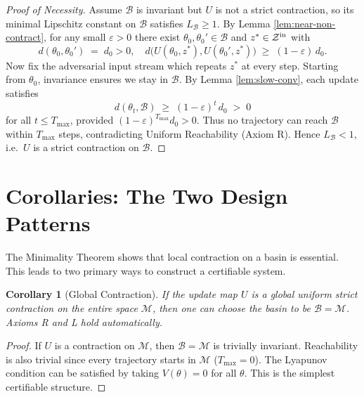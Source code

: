\documentclass[12pt]{article}
\theoremstyle{definition}
\theoremstyle{plain}
\newtheorem{corollary}{Corollary}[section]
\begin{document}
\begin{proof}[Proof of Necessity]
Assume \(\mathcal B\) is invariant but \(U\) is not a strict contraction,
so its minimal Lipschitz constant on \(\mathcal B\) satisfies \(L_{\mathcal B}\ge1\).
By Lemma \ref{lem:near-non-contract}, for any small \(\varepsilon>0\) there
exist \(\theta_0,\theta_0'\in\mathcal B\) and \(z^*\in\mathcal Z^{\rm in}\)
with
\[
d(\theta_0,\theta_0')\;=\;d_0>0,
\quad
d\bigl(U(\theta_0,z^*),U(\theta_0',z^*)\bigr)
\;\ge\;(1-\varepsilon)\,d_0.
\]
Now fix the adversarial input stream which repeats \(z^*\) at every step.
Starting from \(\theta_0\), invariance ensures we stay in \(\mathcal B\).  By
Lemma \ref{lem:slow-conv}, each update satisfies
\[
d(\theta_t,\mathcal B)\;\ge\;(1-\varepsilon)^t\,d_0
\;>\;0
\]
for all \(t\le T_{\max}\), provided
\((1-\varepsilon)^{T_{\max}}d_0>0\).  Thus no trajectory can reach
\(\mathcal B\) within \(T_{\max}\) steps, contradicting Uniform Reachability
(Axiom R).  Hence \(L_{\mathcal B}<1\), i.e.\ \(U\) is a strict contraction
on \(\mathcal B\).
\end{proof}


\section{Corollaries: The Two Design Patterns}
\label{sec:minimality_local_contraction_corollaries}
The Minimality Theorem shows that local contraction on a basin is essential. This leads to two primary ways to construct a certifiable system.

\begin{corollary}[Global Contraction]
If the update map $U$ is a global uniform strict contraction on the entire space $\mathcal{M}$, then one can choose the basin to be $\mathcal{B}=\mathcal{M}$. Axioms R and L hold automatically.
\end{corollary}
\begin{proof}
If $U$ is a contraction on $\mathcal{M}$, then $\mathcal{B}=\mathcal{M}$ is trivially invariant. Reachability is also trivial since every trajectory starts in $\mathcal{M}$ ($T_{\max}=0$). The Lyapunov condition can be satisfied by taking $V(\theta)=0$ for all $\theta$. This is the simplest certifiable structure.
\end{proof}
\end{document}
